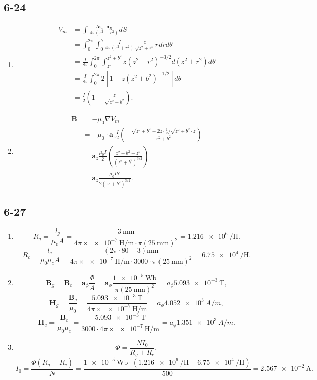 \documentclass[6pt,a4paper]{article}
\begin{document}
\subsection{6-24}
\begin{enumerate}[label=\alph*)]
\item
\begin{align*}
V_m&=\int\frac{I\mathbf{a}_n\cdot\mathbf{a}_R}{4\pi(z^2+r^2)} dS\\
&=\int_0^{2\pi}\int_0^b \frac{I}{4\pi(z^2+r^2)}\frac{z}{\sqrt{z^2+r^2}}rdrd\theta\\
&=\frac{I}{8\pi}\int_0^{2\pi}\int_{z^2}^{z^2+b^2}z(z^2+r^2)^{-3/2}d(z^2+r^2)d\theta\\
&=\frac{I}{8\pi}\int_0^{2\pi}2[1-z(z^2+b^2)^{-1/2}]d\theta\\
&=\frac{I}{2}\left(1-\frac{z}{\sqrt{z^2+b^2}}\right).
\end{align*}
\item
\begin{align*}
\mathbf{B}&=-\mu_0\nabla V_m\\
&=-\mu_0\cdot\mathbf{a}_z\frac{I}{2}\left(-\frac{\sqrt{z^2+b^2}-2z\cdot\frac{1}{2}/\sqrt{z^2+b^2}\cdot z}{z^2+b^2}\right)\\
&=\mathbf{a}_z\frac{\mu_0I}{2}\left(\frac{z^2+b^2-z^2}{(z^2+b^2)^{3/2}}\right)\\
&=\mathbf{a}_z\frac{\mu_0Ib^2}{2(z^2+b^2)^{3/2}}.
\end{align*}
\end{enumerate}

\subsection{6-27}
\begin{enumerate}[label=\alph*)]
\item
$$R_g=\frac{l_g}{\mu_0A}=\frac{\SI{3}{\milli\meter}}{4\pi\times\SI{e-7}{\henry/\meter}\cdot\pi(\SI{25}{\milli\meter})^2}=\SI{1.216e6}{\per\henry}.$$
$$R_c=\frac{l_c}{\mu_0\mu_cA}=\frac{(2\pi\cdot 80-3)\si{\milli\meter}}{4\pi\times\SI{e-7}{\henry/\meter}\cdot3000\cdot\pi(\SI{25}{\milli\meter})^2}=\SI{6.75e4}{\per\henry}.$$
\item
$$\mathbf{B}_g=\mathbf{B}_c=\mathbf{a}_\phi\frac{\Phi}{A}=\mathbf{a}_\phi\frac{\SI{1e-5}{\weber}}{\pi(\SI{25}{\milli\meter})^2}={a}_\phi\SI{5.093e-3}{\tesla},$$
$$\mathbf{H}_g=\frac{\mathbf{B}_g}{\mu_0}=\frac{\SI{5.093e-3}{\tesla}}{4\pi\times\SI{e-7}{\henry/\meter}}={a}_\phi\SI{4.052e3}{A/m},$$
$$\mathbf{H}_c=\frac{\mathbf{B}_c}{\mu_0\mu_c}=\frac{\SI{5.093e-3}{\tesla}}{3000\cdot4\pi\times\SI{e-7}{\henry/\meter}}={a}_\phi\SI{1.351e3}{A/m}.$$
\item
$$\Phi=\frac{NI_0}{R_g+R_c},$$
$$I_0=\frac{\Phi(R_g+R_c)}{N}=\frac{\SI{1e-5}{\weber}\cdot(\SI{1.216e6}{\per\henry}+\SI{6.75e4}{\per\henry})}{500}=\SI{2.567e-2}{\ampere}.$$
\end{enumerate}
\end{document}
